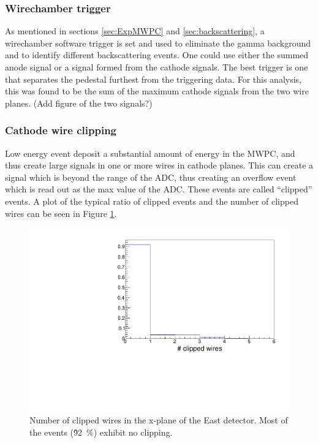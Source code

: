 \subsubsection{Wirechamber trigger} \label{sssec:mwpctrigg}

As mentioned in sections \ref{sec:ExpMWPC} and \ref{sec:backscattering}, a wirechamber
software trigger is set and used to eliminate the gamma background and to identify different
backscattering events. One could use either the summed anode signal or a signal formed from
the cathode signals. The best trigger is one that separates the pedestal furthest from the
triggering data. For this analysis, this was found to be the sum of the maximum cathode
signals from the two wire planes. (Add figure of the two signals?)

\subsubsection{Cathode wire clipping}

Low energy event deposit a substantial amount of energy in the MWPC, and thus create large
signals in one or more wires in cathode planes. This can create a signal which is beyond the
range of the ADC, thus creating an overflow event which is read out as the max value of the ADC.
These events are called ``clipped'' events. A plot of the typical ratio of clipped events and the
number of clipped wires can be seen in Figure \ref{fig:nClipped}.

\begin{figure}[h]
  \centering
  \includegraphics[scale=0.6,page=1]{4-UCNACalibrations/mwpc_position.pdf} 
  \caption{Number of clipped wires in the x-plane of the East detector. Most of the events
    (\~92~\%) exhibit no clipping.}
  \label{fig:nClipped}
\end{figure}


